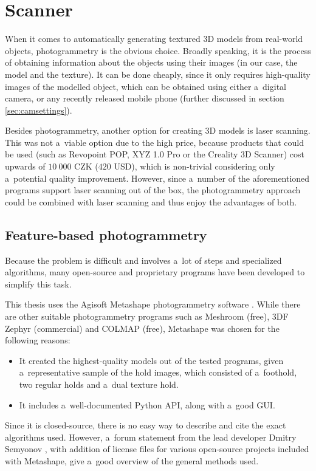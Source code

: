 \chapter{Scanner}\label{sec:scanner}
When it comes to automatically generating textured 3D models from real-world objects, photogrammetry is the obvious choice.
Broadly speaking, it is the process of obtaining information about the objects using their images (in our case, the model and the texture).
It can be done cheaply, since it only requires high-quality images of the modelled object, which can be obtained using either a~digital camera, or any recently released mobile phone (further discussed in section \ref{sec:camsettings}).

Besides photogrammetry, another option for creating 3D models is laser scanning.
This was not a~viable option due to the high price, because products that could be used (such as Revopoint POP, XYZ 1.0 Pro or the Creality 3D Scanner) cost upwards of $10\ 000$ CZK ($420$ USD), which is non-trivial considering only a~potential quality improvement.
However, since a~number of the aforementioned programs support laser scanning out of the box, the photogrammetry approach could be combined with laser scanning and thus enjoy the advantages of both.

\section{Feature-based photogrammetry}
Because the problem is difficult and involves a~lot of steps and specialized algorithms, many open-source and proprietary programs have been developed to simplify this task.

This thesis uses the Agisoft Metashape photogrammetry software \cite{metashape}.
While there are other suitable photogrammetry programs such as Meshroom (free), 3DF Zephyr (commercial) and COLMAP (free), Metashape was chosen for the following reasons:
\begin{itemize}
	\item It created the highest-quality models out of the tested programs, given a~representative sample of the hold images, which consisted of a~foothold, two regular holds and a~dual texture hold.
	\item It includes a~well-documented Python API, along with a~good GUI.
\end{itemize}

Since it is closed-source, there is no easy way to describe and cite the exact algorithms used.
However, a~forum statement from the lead developer Dmitry Semyonov \parencite{metashapeForumPost}, with addition of license files for various open-source projects included with Metashape, give a~good overview of the general methods used.


